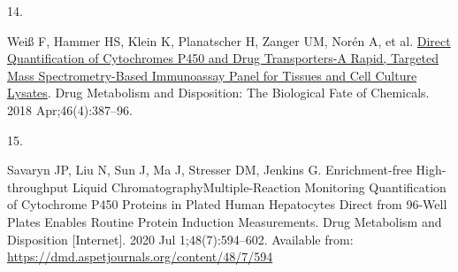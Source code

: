 \documentclass[
  letterpaper,
  DIV=11,
  numbers=noendperiod,
  oneside]{scrartcl}
\newlength{\cslhangindent}
\newlength{\csllabelwidth}
\newenvironment{CSLReferences}[2] %
 {\begin{list}{}{%
  \setlength{\itemindent}{0pt}
  \setlength{\leftmargin}{0pt}
  \setlength{\parsep}{0pt}
  \ifodd #1
   \setlength{\leftmargin}{\cslhangindent}
   \setlength{\itemindent}{-1\cslhangindent}
  \fi
  \setlength{\itemsep}{#2\baselineskip}}}
 {\end{list}}
\newcommand{\CSLLeftMargin}[1]{\parbox[t]{\csllabelwidth}{\strut#1\strut}}
\newcommand{\CSLRightInline}[1]{\parbox[t]{\linewidth - \csllabelwidth}{\strut#1\strut}}
\begin{document}
\begin{CSLReferences}{0}{1}
\CSLLeftMargin{14. }%
\CSLRightInline{Weiß F, Hammer HS, Klein K, Planatscher H, Zanger UM,
Norén A, et al. \href{https://doi.org/10.1124/dmd.117.078626}{Direct
Quantification of Cytochromes P450 and Drug Transporters-A Rapid,
Targeted Mass Spectrometry-Based Immunoassay Panel for Tissues and Cell
Culture Lysates}. Drug Metabolism and Disposition: The Biological Fate
of Chemicals. 2018 Apr;46(4):387--96. }

\CSLLeftMargin{15. }%
\CSLRightInline{Savaryn JP, Liu N, Sun J, Ma J, Stresser DM, Jenkins G.
Enrichment-free High-throughput Liquid
Chromatography{\textendash}Multiple-Reaction Monitoring Quantification
of Cytochrome P450 Proteins in Plated Human Hepatocytes Direct from
96-Well Plates Enables Routine Protein Induction Measurements. Drug
Metabolism and Disposition {[}Internet{]}. 2020 Jul 1;48(7):594--602.
Available from: \url{https://dmd.aspetjournals.org/content/48/7/594}}

\end{CSLReferences}
\end{document}
